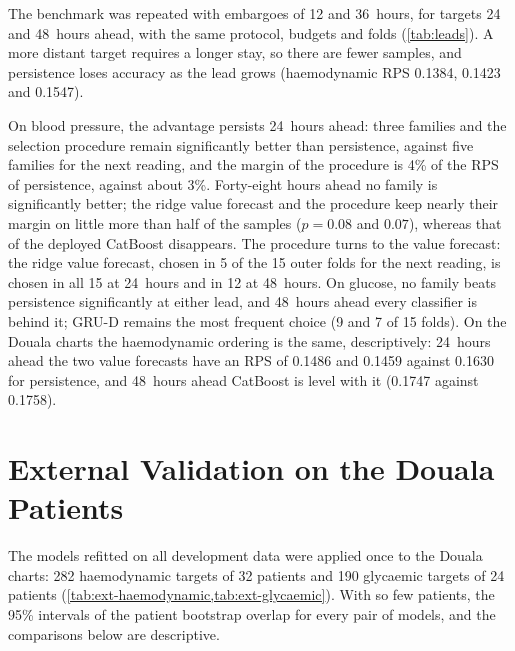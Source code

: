 \documentclass[11pt,a4paper,oneside]{report}
\begin{document}
The benchmark was repeated with embargoes of 12 and 36~hours, for targets 24 and 48~hours ahead, with the same protocol, budgets and folds (\cref{tab:leads}). A more distant target requires a longer stay, so there are fewer samples, and persistence loses accuracy as the lead grows (haemodynamic RPS 0.1384, 0.1423 and 0.1547).



On blood pressure, the advantage persists 24~hours ahead: three families and the selection procedure remain significantly better than persistence, against five families for the next reading, and the margin of the procedure is 4\% of the RPS of persistence, against about 3\%. Forty-eight hours ahead no family is significantly better; the ridge value forecast and the procedure keep nearly their margin on little more than half of the samples ($p = 0.08$ and $0.07$), whereas that of the deployed CatBoost disappears. The procedure turns to the value forecast: the ridge value forecast, chosen in 5 of the 15 outer folds for the next reading, is chosen in all 15 at 24~hours and in 12 at 48~hours. On glucose, no family beats persistence significantly at either lead, and 48~hours ahead every classifier is behind it; GRU-D remains the most frequent choice (9 and 7 of 15 folds). On the Douala charts the haemodynamic ordering is the same, descriptively: 24~hours ahead the two value forecasts have an RPS of 0.1486 and 0.1459 against 0.1630 for persistence, and 48~hours ahead CatBoost is level with it (0.1747 against 0.1758).

\section{External Validation on the Douala Patients}\label{sec:results-external}

The models refitted on all development data were applied once to the Douala charts: 282 haemodynamic targets of 32 patients and 190 glycaemic targets of 24 patients (\cref{tab:ext-haemodynamic,tab:ext-glycaemic}). With so few patients, the 95\% intervals of the patient bootstrap overlap for every pair of models, and the comparisons below are descriptive.



\end{document}

